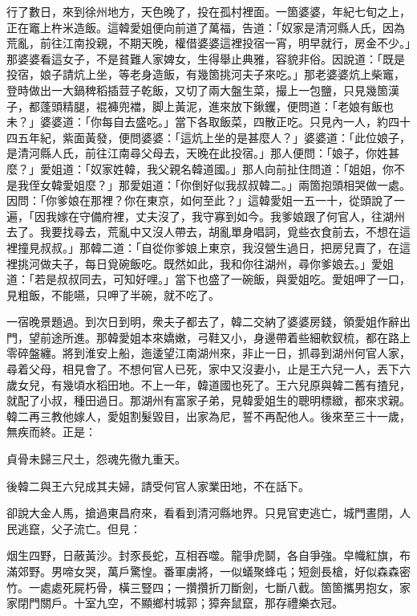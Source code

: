 行了數日，來到徐州地方，天色晚了，投在孤村裡面。一箇婆婆，年紀七旬之上，正在竈上杵米造飯。這韓愛姐便向前道了萬福，告道：「奴家是清河縣人氏，因為荒亂，前往江南投親，不期天晚，權借婆婆這裡投宿一宵，明早就行，房金不少。」那婆婆看這女子，不是貧難人家婢女，生得舉止典雅，容貌非俗。因說道：「既是投宿，娘子請炕上坐，等老身造飯，有幾箇挑河夫子來吃。」那老婆婆炕上柴竈，登時做出一大鍋稗稻插荳子乾飯，又切了兩大盤生菜，撮上一包鹽，只見幾箇漢子，都蓬頭精腿，裩褲兜襠，脚上黃泥，進來放下鍬钁，便問道：「老娘有飯也未？」婆婆道：「你每自去盛吃。」當下各取飯菜，四散正吃。只見內一人，約四十四五年紀，紫面黃發，便問婆婆：「這炕上坐的是甚麼人？」婆婆道：「此位娘子，是清河縣人氏，前往江南尋父母去，天晚在此投宿。」那人便問：「娘子，你姓甚麼？」愛姐道：「奴家姓韓，我父親名韓道國。」那人向前扯住問道：「姐姐，你不是我侄女韓愛姐麼？」那愛姐道：「你倒好似我叔叔韓二。」兩箇抱頭相哭做一處。因問：「你爹娘在那裡？你在東京，如何至此？」這韓愛姐一五一十，從頭說了一遍，「因我嫁在守備府裡，丈夫沒了，我守寡到如今。我爹娘跟了何官人，往湖州去了。我要找尋去，荒亂中又沒人帶去，胡亂單身唱詞，覓些衣食前去，不想在這裡撞見叔叔。」那韓二道：「自從你爹娘上東京，我沒營生過日，把房兒賣了，在這裡挑河做夫子，每日覓碗飯吃。既然如此，我和你往湖州，尋你爹娘去。」愛姐道：「若是叔叔同去，可知好哩。」當下也盛了一碗飯，與愛姐吃。愛姐呷了一口，見粗飯，不能嚥，只呷了半碗，就不吃了。

一宿晚景題過。到次日到明，衆夫子都去了，韓二交納了婆婆房錢，領愛姐作辭出門，望前途所進。那韓愛姐本來嬌嫩，弓鞋又小，身邊帶着些細軟釵梳，都在路上零碎盤纏。將到淮安上船，迤逶望江南湖州來，非止一日，抓尋到湖州何官人家，尋着父母，相見會了。不想何官人已死，家中又沒妻小，止是王六兒一人，丟下六歲女兒，有幾頃水稻田地。不上一年，韓道國也死了。王六兒原與韓二舊有揸兒，就配了小叔，種田過日。{}那湖州有富家子弟，見韓愛姐生的聰明標緻，都來求親。韓二再三教他嫁人，愛姐割髮毀目，出家為尼，誓不再配他人。{}後來至三十一歲，無疾而終。正是：

\begin{myquote}
貞骨未歸三尺土，怨魂先徹九重天。
\end{myquote}

後韓二與王六兒成其夫婦，請受何官人家業田地，不在話下。

卻說大金人馬，搶過東昌府來，看看到清河縣地界。只見官吏逃亡，城門晝閉，人民逃竄，父子流亡。但見：

\begin{myquote}
烟生四野，日蔽黃沙。封豕長蛇，互相吞噬。龍爭虎鬬，各自爭強。皁幟紅旗，布滿郊野。男啼女哭，萬戶驚惶。番軍虜將，一似蟻聚蜂屯；短劍長槍，好似森森密竹。一處處死屍朽骨，橫三豎四；一攢攢折刀斷劍，七斷八截。箇箇攜男抱女，家家閉門關戶。十室九空，不顯鄉村城郭；獐奔鼠竄，那存禮樂衣冠。
\end{myquote}

